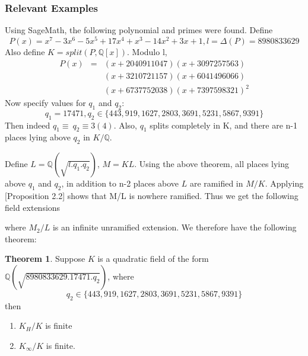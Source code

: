 \documentclass[12pt]{extarticle}
\newcommand{\<}{\langle}
\renewcommand{\>}{\rangle}
\theoremstyle{definition}
\newtheorem{theorem}{Theorem}
\begin{document}
\subsubsection*{Relevant Examples}
Using SageMath, the following polynomial and primes were found. Define 
\begin{equation}
    P(x) = x^7-3x^6-5x^5+17x^4+x^3-14x^2+3x+1, l=\Delta(P)=8980833629
\end{equation}
Also define $K=split(P,\mathbb{Q}[x])$. Modulo l,
\begin{eqnarray*}
        P(x)&=&(x+2040911047)(x+3097257563)\\ & & {} (x+3210721157)(x+6041496066)\\ & & {}(x+6737752038)(x+7397598321)^2
\end{eqnarray*}
Now specify values for $q_1$ and $q_2$:
\begin{equation}
    q_1=17471,q_2\in\{443,919,1627,2803,3691,5231,5867,9391\}
\end{equation}
Then indeed $q_1\equiv\:q_2\equiv3(4)$. Also, $q_1$ splits completely in K, and there are n-1 places lying above $q_2$ in $K/\mathbb{Q}$.
\par
Define $L=\mathbb{Q}(\sqrt{l.q_1.q_2})$, $M=KL$. Using the above theorem, all places lying above $q_1$ and $q_2$, in addition to n-2 places above $L$ are ramified in $M/K$.  Applying \cite{MAIR}[Proposition 2.2] shows that M/L is nowhere ramified. Thus we get the following field extensions
\begin{center}
\end{center}
where $M_2/L$ is an infinite unramified extension. We therefore have the following theorem:
\begin{theorem}
    Suppose $K$ is a quadratic field of the form $\mathbb{Q}(\sqrt{8980833629.17471.q_2})$, where 
    \begin{equation}
        q_2\in\{443,919,1627,2803,3691,5231,5867,9391\}
    \end{equation}
    then \begin{enumerate}
        \item $K_H/K$ is finite
        \item $K_\infty/K$ is finite.
    \end{enumerate}
\end{theorem}
\end{document}
